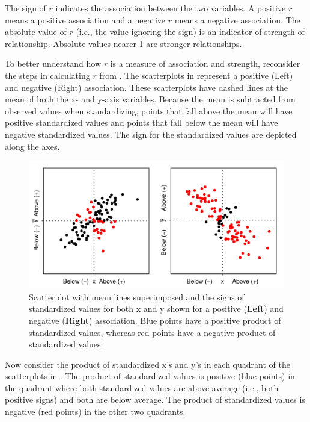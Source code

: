 \documentclass[10pt,openany]{book}\usepackage[]{graphicx}\usepackage[]{color}
\newenvironment{knitrout}{}{} %
\begin{document}
The sign of $r$ indicates the association between the two variables. A positive $r$ means a positive association and a negative $r$ means a negative association. The absolute value of $r$ (i.e., the value ignoring the sign) is an indicator of strength of relationship. Absolute values nearer 1 are stronger relationships.

To better understand how $r$ is a measure of association and strength, reconsider the steps in calculating $r$ from . The scatterplots in  represent a positive (Left) and negative (Right) association. These scatterplots have dashed lines at the mean of both the x- and y-axis variables. Because the mean is subtracted from observed values when standardizing, points that fall above the mean will have positive standardized values and points that fall below the mean will have negative standardized values. The sign for the standardized values are depicted along the axes.

\begin{knitrout}
\color{fgcolor}\begin{figure}[hbtp]

{\centering \includegraphics[width=.65\linewidth]{Figs/corrdefn1-1} 

}

\caption[Scatterplot with mean lines superimposed and the signs of standardized values for both x and y shown for a positive (\textbf{Left}) and negative (\textbf{Right}) association]{Scatterplot with mean lines superimposed and the signs of standardized values for both x and y shown for a positive (\textbf{Left}) and negative (\textbf{Right}) association. Blue points have a positive product of standardized values, whereas red points have a negative product of standardized values.}\label{fig:corrdefn1}
\end{figure}


\end{knitrout}

\vspace{-6pt}
Now consider the product of standardized x's and y's in each quadrant of the scatterplots in . The product of standardized values is positive (blue points) in the quadrant where both standardized values are above average (i.e., both positive signs) and both are below average. The product of standardized values is negative (red points) in the other two quadrants.
\end{document}
